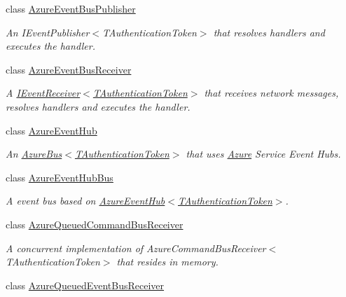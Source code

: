 \begin{DoxyCompactItemize}
class \hyperlink{classCqrs_1_1Azure_1_1ServiceBus_1_1AzureEventBusPublisher}{Azure\+Event\+Bus\+Publisher}
\begin{DoxyCompactList}\small\item\em An I\+Event\+Publisher$<$\+T\+Authentication\+Token$>$ that resolves handlers and executes the handler. \end{DoxyCompactList}\item 
class \hyperlink{classCqrs_1_1Azure_1_1ServiceBus_1_1AzureEventBusReceiver}{Azure\+Event\+Bus\+Receiver}
\begin{DoxyCompactList}\small\item\em A \hyperlink{interfaceCqrs_1_1Events_1_1IEventReceiver}{I\+Event\+Receiver$<$\+T\+Authentication\+Token$>$} that receives network messages, resolves handlers and executes the handler. \end{DoxyCompactList}\item 
class \hyperlink{classCqrs_1_1Azure_1_1ServiceBus_1_1AzureEventHub}{Azure\+Event\+Hub}
\begin{DoxyCompactList}\small\item\em An \hyperlink{classCqrs_1_1Azure_1_1ServiceBus_1_1AzureBus_a1046ff74282fd178f43e28420433d2a9_a1046ff74282fd178f43e28420433d2a9}{Azure\+Bus$<$\+T\+Authentication\+Token$>$} that uses \hyperlink{namespaceCqrs_1_1Azure}{Azure} Service Event Hubs. \end{DoxyCompactList}\item 
class \hyperlink{classCqrs_1_1Azure_1_1ServiceBus_1_1AzureEventHubBus}{Azure\+Event\+Hub\+Bus}
\begin{DoxyCompactList}\small\item\em A event bus based on \hyperlink{classCqrs_1_1Azure_1_1ServiceBus_1_1AzureEventHub_adef2c26639ae4a7725c397da7fd90000_adef2c26639ae4a7725c397da7fd90000}{Azure\+Event\+Hub$<$\+T\+Authentication\+Token$>$}. \end{DoxyCompactList}\item 
class \hyperlink{classCqrs_1_1Azure_1_1ServiceBus_1_1AzureQueuedCommandBusReceiver}{Azure\+Queued\+Command\+Bus\+Receiver}
\begin{DoxyCompactList}\small\item\em A concurrent implementation of Azure\+Command\+Bus\+Receiver$<$\+T\+Authentication\+Token$>$ that resides in memory. \end{DoxyCompactList}\item 
class \hyperlink{classCqrs_1_1Azure_1_1ServiceBus_1_1AzureQueuedEventBusReceiver}{Azure\+Queued\+Event\+Bus\+Receiver}

\end{DoxyCompactItemize}
